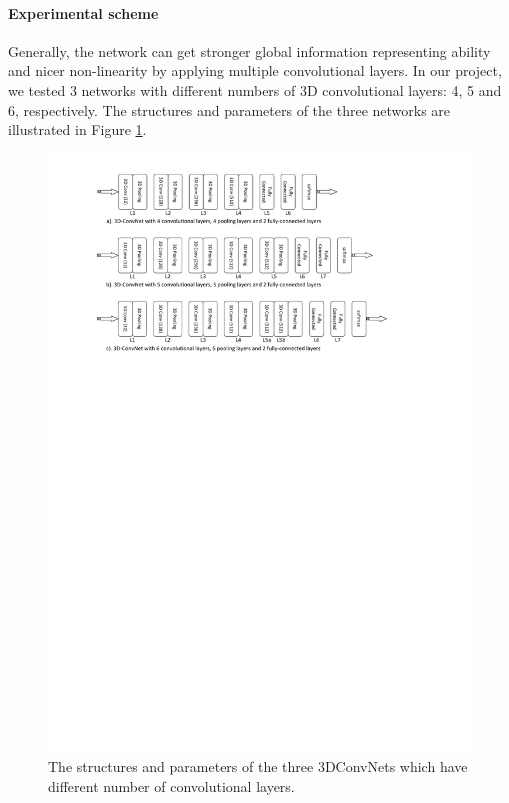 \paragraph{Experimental scheme}
Generally, the network can get stronger global information representing ability and nicer non-linearity by applying multiple convolutional layers. In our project, we tested 3 networks with different numbers of 3D convolutional layers: 4, 5 and 6, respectively. The structures and parameters of the three networks are illustrated in Figure \ref{fig:cnn_layers}.
\begin{figure}
 	\includegraphics[trim=1cm 20cm 0cm 1cm]{fig01/cnn_layers.pdf}
 	\caption{The structures and parameters of the three 3DConvNets which have different number of convolutional layers.}
 	\label{fig:cnn_layers}
\end{figure}
